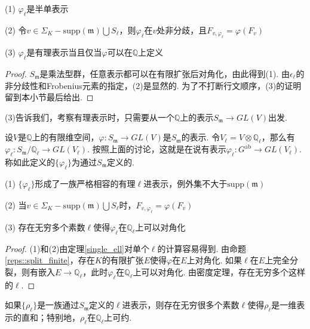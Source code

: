\begin{cthm}
    (1) $\varphi_{\ell}$是半单表示

    (2) 令$v\in \Sigma_K - \mathrm{supp}(\mathfrak{m})\bigcup S_{\ell}$，则$\varphi_{\ell}$在$v$处非分歧，且$F_{v, \varphi_{\ell}} = \varphi(F_v)$

    (3) $\varphi_{\ell}$是有理表示当且仅当$\varphi$可以在$\mathbb{Q}$上定义 \label{single_ell}
\end{cthm}

\begin{proof}
    $S_{\mathfrak{m}}$是乘法型群，任意表示都可以在有限扩张后对角化，由此得到(1). 由$\epsilon_{\ell}$的非分歧性和Frobenius元素的指定，(2)是显然的.
    为了不打断行文顺序，(3)的证明留到本小节最后给出.
\end{proof}

(3)告诉我们，考察有理表示时，只需要从一个$\mathbb{Q}$上的表示$S_{\mathfrak{m}}\to GL(V)$出发.

设$V$是$\mathbb{Q}$上的有限维空间，$\varphi: S_{\mathfrak{m}}\to GL(V)$是$S_{\mathfrak{m}}$的表示. 令$V_{\ell} = V\otimes \mathbb{Q}_{\ell}$，那么有$\varphi_{\ell}: S_{\mathfrak{m}}/\mathbb{Q}_{\ell}\to GL(V_{\ell})$. 按照上面的讨论，这就是在说有表示$\varphi_{\ell}: G^{\mathrm{ab}}\to GL(V_{\ell})$. 称如此定义的$\{\varphi_{\ell}\}$为通过$S_{\mathfrak{m}}$定义的.

\begin{cthm}
    (1) $\{\varphi_{\ell}\}$形成了一族严格相容的有理$\ell$进表示，例外集不大于$\mathrm{supp}(\mathfrak{m})$

    (2) 当$v\in \Sigma_K - \mathrm{supp}(\mathfrak{m})\bigcup S_{\ell}$时，$F_{v, \varphi_{\ell}} = \varphi(F_v)$

    (3) 存在无穷多个素数$\ell$使得$\varphi_{\ell}$在$\mathbb{Q}_{\ell}$上可以对角化
\end{cthm}

\begin{proof}
    (1)和(2)由定理\ref{single_ell}对单个$\ell$的计算容易得到. 由命题\ref{reps::split_finite}，存在$K$的有限扩张$E$使得$\varphi$在$E$上对角化. 如果$\ell$在$E$上完全分裂，则有嵌入$E\to \mathbb{Q}_{\ell}$，此时$\varphi_{\ell}$在$\mathbb{Q}_{\ell}$上可以对角化. 由\Chebotarev 密度定理，存在无穷多个这样的$\ell$.
\end{proof}

\begin{ccor}
    如果$\{\rho_{\ell}\}$是一族通过$S_{\mathfrak{m}}$定义的$\ell$进表示，则存在无穷很多个素数$\ell$使得$\rho_{\ell}$是一维表示的直和；特别地，$\rho_{\ell}$在$\mathbb{Q}_{\ell}$上可约.\label{sm_to_reducile}
\end{ccor}

